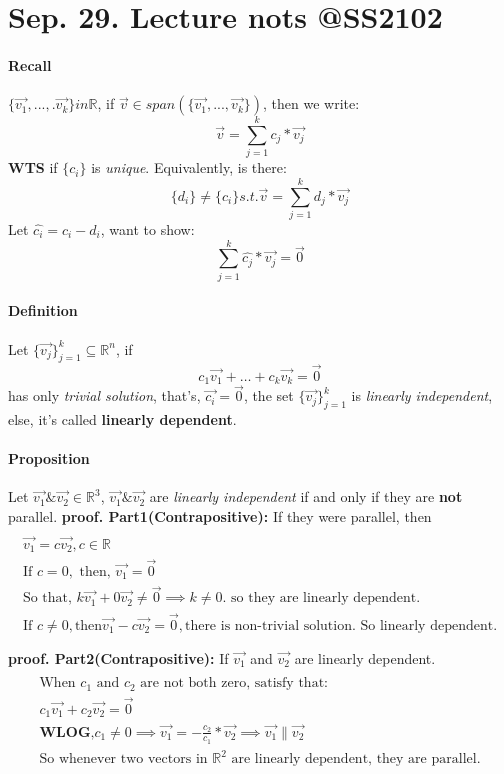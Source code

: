 \documentclass{article}
\begin{document}
	\section{Sep. 29. Lecture nots @SS2102}
	\paragraph{Recall} $\{\vec{v_1},...,.\vec{v_k}\} in \mathbb{R}$, if $\vec{v} \in span(\{\vec{v_1},...,\vec{v_k}\})$, then we write:
	\[
	\vec{v} = \sum_{j=1}^k c_j * \vec{v_j}
	\]
	\textbf{WTS} if $\{c_i\}$ is \emph{unique}. Equivalently, is there:
	\[
	\{d_i\} \neq \{c_i\} s.t. \vec{v} = \sum_{j=1}^k d_j * \vec{v_j}
	\]
	Let $\hat{c_i} = c_i - d_i $, want to show:
	\[
	\sum_{j=1}^k \hat{c_j} * \vec{v_j} = \vec{0}
	\]
	\paragraph{Definition} Let $\{\vec{v_j}\}_{j=1}^k \subseteq \mathbb{R}^n$, if 
	\[
	c_1 \vec{v_1} + \dots + c_k \vec{v_k} = \vec{0}
	\]
	has only \emph{trivial solution}, that's, $\vec{c_i}=\vec{0}$, the set $\{\vec{v_j}\}_{j=1}^k$ is \emph{linearly independent}, else, it's called \textbf{linearly dependent}.
	\paragraph{Proposition} Let $\vec{v_1} \& \vec{v_2} \in \mathbb{R}^3$, $\vec{v_1} \& \vec{v_2}$ are \emph{linearly independent} if and only if they are \textbf{not} parallel.
	\newline
	\textbf{proof. Part1(Contrapositive):} If they were parallel, then
	\begin{multline}
	\\
	\vec{v_1} = c\vec{v_2}, c \in \mathbb{R} \\
	\text{If } c = 0, \text{ then, } \vec{v_1} = \vec{0} \\
	\text{So that, } k \vec{v_1} + 0 \vec{v_2} \neq \vec{0} \implies k \neq 0.\text{ so they are linearly dependent.}\\
	\text{If } c \neq 0, \text{then} \vec{v_1} - c\vec{v_2} = \vec{0}, \text{there is non-trivial solution. So linearly dependent.}\\
	\\
	\end{multline}
	\textbf{proof. Part2(Contrapositive):} If $\vec{v_1}$ and $\vec{v_2}$ are linearly dependent.
	\begin{multline}
	\\
	\text{When $c_1$ and $c_2$ are not both zero, satisfy that: }\\
	c_1 \vec{v_1} + c_2 \vec{v_2} = \vec{0} \\
	\textbf{WLOG,} c_1 \neq 0 \implies \vec{v_1} = - \frac{c_2}{c_1} * \vec{v_2} \implies \vec{v_1} \parallel \vec{v_2} \\
	\text{So whenever two vectors in $\mathbb{R}^2$ are linearly dependent, they are parallel.}
	\\
	\end{multline}
\end{document}
